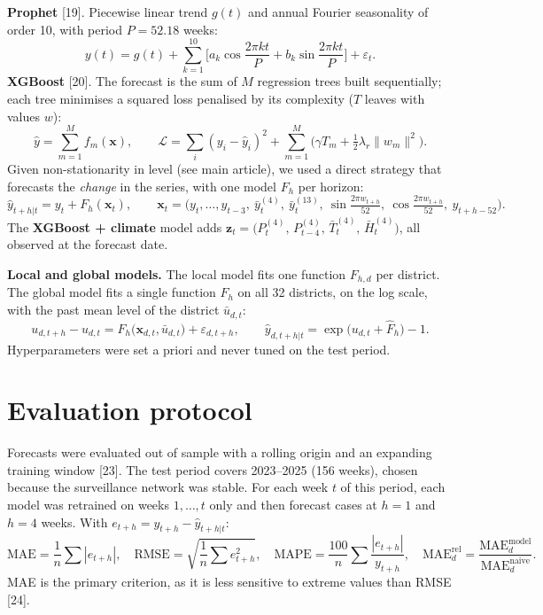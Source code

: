\documentclass[11pt]{article}
\begin{document}
\textbf{Prophet} [19]. Piecewise linear trend $g(t)$ and annual Fourier seasonality of order 10, with period $P=52.18$ weeks:
\begin{equation}
y(t)=g(t)+\sum_{k=1}^{10}\Big[a_k\cos\frac{2\pi kt}{P}+b_k\sin\frac{2\pi kt}{P}\Big]+\varepsilon_t .
\label{eq:prophet}
\end{equation}
\textbf{XGBoost} [20]. The forecast is the sum of $M$ regression trees built sequentially; each tree minimises a squared loss penalised by its complexity ($T$ leaves with values $w$):
\begin{equation}
\hat{y}=\sum_{m=1}^{M}f_m(\mathbf{x}),\qquad \mathcal{L}=\sum_i(y_i-\hat{y}_i)^2+\sum_{m=1}^{M}\Big(\gamma T_m+\tfrac{1}{2}\lambda_r\lVert w_m\rVert^2\Big).
\label{eq:xgb}
\end{equation}
Given non-stationarity in level (see main article), we used a direct strategy that forecasts the \textit{change} in the series, with one model $F_h$ per horizon:
\begin{equation}
\hat{y}_{t+h|t}=y_t+F_h(\mathbf{x}_t),\qquad \mathbf{x}_t=\Big(y_t,\dots,y_{t-3},\ \bar{y}^{(4)}_t,\ \bar{y}^{(13)}_t,\ \sin\tfrac{2\pi w_{t+h}}{52},\ \cos\tfrac{2\pi w_{t+h}}{52},\ y_{t+h-52}\Big).
\label{eq:direct}
\end{equation}
The \textbf{XGBoost + climate} model adds $\mathbf{z}_t=\big(P^{(4)}_t,\,P^{(4)}_{t-4},\,\bar{T}^{(4)}_t,\,\bar{H}^{(4)}_t\big)$, all observed at the forecast date.

\textbf{Local and global models.} The local model fits one function $F_{h,d}$ per district. The global model fits a single function $F_h$ on all 32 districts, on the log scale, with the past mean level of the district $\bar{u}_{d,t}$:
\begin{equation}
u_{d,t+h}-u_{d,t}=F_h\big(\mathbf{x}_{d,t},\bar{u}_{d,t}\big)+\varepsilon_{d,t+h},\qquad \hat{y}_{d,t+h|t}=\exp\big(u_{d,t}+\hat{F}_h\big)-1 .
\label{eq:global}
\end{equation}
Hyperparameters were set a priori and never tuned on the test period.



\section{Evaluation protocol}
Forecasts were evaluated out of sample with a rolling origin and an expanding training window [23]. The test period covers 2023–2025 (156 weeks), chosen because the surveillance network was stable. For each week $t$ of this period, each model was retrained on weeks $1,\dots,t$ only and then forecast cases at $h=1$ and $h=4$ weeks. With $e_{t+h}=y_{t+h}-\hat{y}_{t+h|t}$:
\begin{equation}
\text{MAE}=\frac{1}{n}\sum|e_{t+h}|,\quad \text{RMSE}=\sqrt{\frac{1}{n}\sum e_{t+h}^2},\quad \text{MAPE}=\frac{100}{n}\sum\frac{|e_{t+h}|}{y_{t+h}},\quad \text{MAE}^{\text{rel}}_d=\frac{\text{MAE}^{\text{model}}_d}{\text{MAE}^{\text{naive}}_d}.
\label{eq:metrics}
\end{equation}
MAE is the primary criterion, as it is less sensitive to extreme values than RMSE [24].
\end{document}
